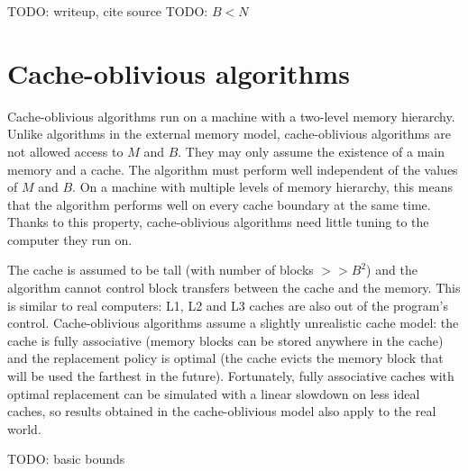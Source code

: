 TODO: writeup, cite source
TODO: $B<N$

\section{Cache-oblivious algorithms}
Cache-oblivious algorithms run on a machine with a two-level memory hierarchy.
Unlike algorithms in the external memory model, cache-oblivious algorithms
are not allowed access to $M$ and $B$. They may only assume the existence
of a main memory and a cache.
The algorithm must perform well independent of the values of $M$ and $B$.
On a machine with multiple levels of memory hierarchy, this means that
the algorithm performs well on every cache boundary at the same time.
Thanks to this property, cache-oblivious algorithms need little tuning to the
computer they run on.

The cache is assumed to be tall (with number of blocks $>> B^2$) and
the algorithm cannot control block transfers between the cache and the memory.
This is similar to real computers: L1, L2 and L3 caches are also out
of the program's control.
Cache-oblivious algorithms assume a slightly unrealistic cache model:
the cache is fully associative (memory blocks can be stored anywhere in the
cache) and the replacement policy is optimal (the cache evicts the memory
block that will be used the farthest in the future).
Fortunately, fully associative caches with optimal replacement can be simulated
with a linear slowdown on less ideal caches, so results obtained in
the cache-oblivious model also apply to the real world.

TODO: basic bounds
